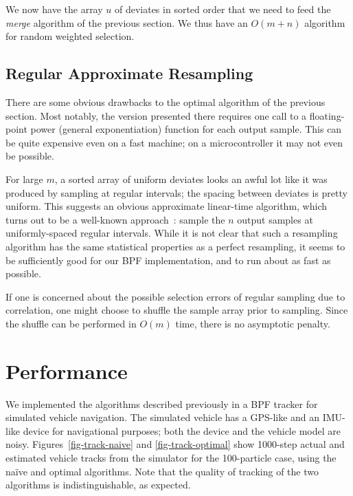 \documentclass[12pt]{article}
\begin{document}
  We now have the array $u$ of deviates in sorted order that
  we need to feed the {\em merge} algorithm of the previous
  section.  We thus have an $O(m + n)$ algorithm for random
  weighted selection.

\subsection{Regular Approximate Resampling}\label{sec-regular}

  There are some obvious drawbacks to the optimal algorithm of
  the previous section.  Most notably, the version presented
  there requires one call to a floating-point power (general
  exponentiation) function for each output sample.  This can
  be quite expensive even on a fast machine; on a
  microcontroller it may not even be possible.

  For large $m$, a sorted array of uniform deviates looks an
  awful lot like it was produced by sampling at regular
  intervals; the spacing between deviates is pretty uniform.
  This suggests an obvious approximate linear-time
  algorithm, which turns out to be a well-known approach~\cite{kitagawa}:
  sample the $n$ output samples at uniformly-spaced regular
  intervals.  While it is not clear that such a resampling
  algorithm has the same statistical properties as a perfect
  resampling, it seems to be sufficiently good for our BPF
  implementation, and to run about as fast as possible.

  If one is concerned about the possible selection errors of
  regular sampling due to correlation, one might choose to
  shuffle the sample array prior to sampling.  Since the
  shuffle can be performed in $O(m)$ time, there is no
  asymptotic penalty.

\section{Performance}

  We implemented the algorithms described previously in a
  BPF tracker for simulated vehicle navigation.  The
  simulated vehicle has a GPS-like and an IMU-like device
  for navigational purposes; both the device and the vehicle
  model are noisy.  Figures~\ref{fig-track-naive} and
  \ref{fig-track-optimal} show 1000-step actual and estimated vehicle
  tracks from the simulator for the 100-particle case, using
  the na\"ive and optimal algorithms.  Note
  that the quality of tracking of the two algorithms is
  indistinguishable, as expected.
\end{document}
